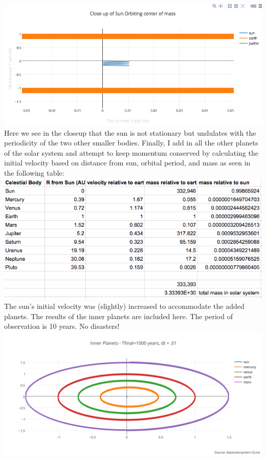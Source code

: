 \documentclass[11pt,a4wide]{article}
\begin{document}
\begin{enumerate}
\includegraphics[width=6in]{sunorbit.png}\\
Here we see in the closeup that the sun is not stationary but undulates with the periodicity of the two other smaller bodies. \newline
Finally, I add in all the other planets of the solar system and attempt to keep momentum conserved by calculating the initial velocity based on distance from sun, orbital period, and mass as seen in the following table: 
\includegraphics[width=6in]{table.png}\\
The sun's initial velocity was (slightly) increased to accommodate the added planets. The results of the inner planets are included here. The period of observation is 10 years. No disasters!
\includegraphics[width=6in]{innerplanets.png}\\

\end{enumerate}
\end{document}
